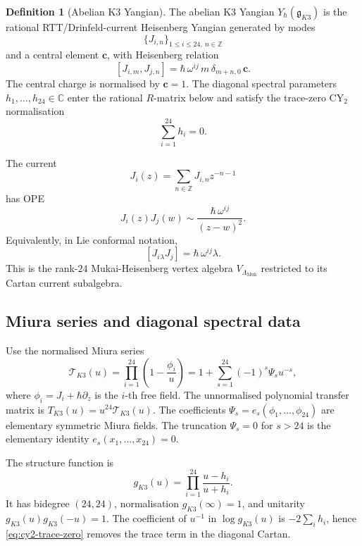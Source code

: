 \documentclass[11pt]{article}
\theoremstyle{definition}
\newtheorem{definition}[theorem]{Definition}
\newcommand{\C}{\mathbb{C}}
\newcommand{\Z}{\mathbb{Z}}
\renewcommand{\gg}{\mathfrak{g}}
\newcommand{\Lmuk}{\Lambda_{\mathrm{Muk}}}
\newcommand{\YgK}{Y_\hbar(\gg_{K3})}
\begin{document}
\begin{definition}[Abelian K3 Yangian]
\label{def:abelian-k3-yangian}
The abelian K3 Yangian $\YgK$ is the rational RTT/Drinfeld-current
Heisenberg Yangian generated by modes
\[
  \{J_{i,n}\}_{1\leq i\leq24,\ n\in\Z}
\]
and a central element $\mathbf c$, with Heisenberg relation
\begin{equation}
\label{eq:heis-commutator}
  [J_{i,m},J_{j,n}]
  =
  \hbar\,\omega^{ij}\,m\,\delta_{m+n,0}\,\mathbf c.
\end{equation}
The central charge is normalised by $\mathbf c=1$. The diagonal spectral
parameters $h_1,\ldots,h_{24}\in\C$ enter the rational $R$-matrix below
and satisfy the trace-zero CY$_2$ normalisation
\begin{equation}
\label{eq:cy2-trace-zero}
  \sum_{i=1}^{24}h_i=0.
\end{equation}
\end{definition}

The current
\[
  J_i(z)=\sum_{n\in\Z}J_{i,n}z^{-n-1}
\]
has OPE
\begin{equation}
\label{eq:k3-heisenberg-ope}
  J_i(z)J_j(w)\sim \frac{\hbar\,\omega^{ij}}{(z-w)^2}.
\end{equation}
Equivalently, in Lie conformal notation,
\[
  [J_i{}_\lambda J_j]=\hbar\,\omega^{ij}\lambda.
\]
This is the rank-$24$ Mukai-Heisenberg vertex algebra
$V_{\Lmuk}$ restricted to its Cartan current subalgebra.

\subsection{Miura series and diagonal spectral data}

Use the normalised Miura series
\begin{equation}
\label{eq:miura-normalised}
  \mathcal T_{K3}(u)
  =
  \prod_{i=1}^{24}\left(1-\frac{\phi_i}{u}\right)
  =
  1+\sum_{s=1}^{24}(-1)^s\Psi_s u^{-s},
\end{equation}
where $\phi_i=J_i+\hbar\partial_z$ is the $i$-th free field. The
unnormalised polynomial transfer matrix is
$T_{K3}(u)=u^{24}\mathcal T_{K3}(u)$. The coefficients
$\Psi_s=e_s(\phi_1,\ldots,\phi_{24})$ are elementary symmetric Miura
fields. The truncation $\Psi_s=0$ for $s>24$ is the elementary identity
$e_s(x_1,\ldots,x_{24})=0$.

The structure function is
\begin{equation}
\label{eq:structure-function-k3}
  g_{K3}(u)=\prod_{i=1}^{24}\frac{u-h_i}{u+h_i}.
\end{equation}
It has bidegree $(24,24)$, normalisation $g_{K3}(\infty)=1$, and
unitarity $g_{K3}(u)g_{K3}(-u)=1$. The coefficient of $u^{-1}$ in
$\log g_{K3}(u)$ is $-2\sum_i h_i$, hence \eqref{eq:cy2-trace-zero}
removes the trace term in the diagonal Cartan.
\end{document}
